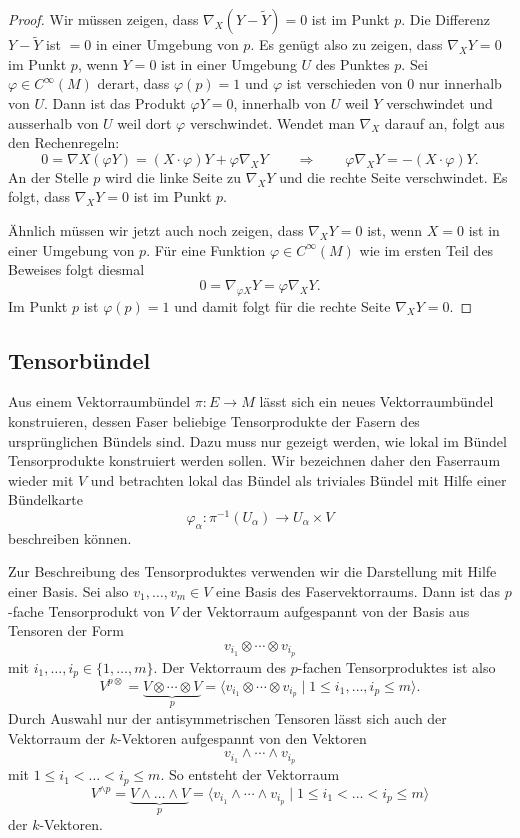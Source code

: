 \begin{proof}
Wir müssen zeigen, dass $\nabla_X(Y-\tilde{Y})=0$ ist im Punkt $p$.
Die Differenz $Y-\tilde{Y}$ ist $=0$ in einer Umgebung von $p$.
Es genügt also zu zeigen, dass $\nabla_XY=0$ im Punkt $p$, wenn $Y=0$
ist in einer Umgebung $U$ des Punktes $p$.
Sei $\varphi\in C^\infty(M)$ derart, dass $\varphi(p)=1$ und 
$\varphi$ ist verschieden von $0$ nur innerhalb von $U$.
Dann ist das Produkt $\varphi Y=0$, innerhalb von $U$ weil $Y$ verschwindet
und ausserhalb von $U$ weil dort $\varphi$ verschwindet.
Wendet man $\nabla_X$ darauf an, folgt aus den Rechenregeln:
\[
0
=
\nabla X(\varphi Y)
=
(X\cdot \varphi)Y
+
\varphi\nabla_X Y
\qquad\Rightarrow\qquad
\varphi\nabla_X Y
=
-(X\cdot\varphi)Y.
\]
An der Stelle $p$ wird die linke Seite zu $\nabla_XY$ und die rechte
Seite verschwindet.
Es folgt, dass $\nabla_XY=0$ ist im Punkt $p$.

Ähnlich müssen wir jetzt auch noch zeigen, dass $\nabla_XY=0$ ist,
wenn $X=0$ ist in einer Umgebung von $p$.
Für eine Funktion $\varphi\in C^\infty(M)$ wie im ersten Teil des Beweises
folgt diesmal
\[
0
=
\nabla_{\varphi X}Y
=
\varphi\nabla_XY.
\]
Im Punkt $p$ ist $\varphi(p)=1$ und damit folgt für die rechte Seite
$\nabla_XY=0$.
\end{proof}

%
%
\subsection{Tensorbündel}
Aus einem Vektorraumbündel $\pi\colon E\to M$ lässt sich ein neues
Vektorraumbündel konstruieren, dessen Faser beliebige Tensorprodukte
der Fasern des ursprünglichen Bündels sind.
Dazu muss nur gezeigt werden, wie lokal im Bündel Tensorprodukte
konstruiert werden sollen.
Wir bezeichnen daher den Faserraum wieder mit $V$ und betrachten
lokal das Bündel als triviales Bündel mit Hilfe einer Bündelkarte
\[
\varphi_\alpha
\colon
\pi^{-1}(U_\alpha)
\to
U_\alpha\times V 
\]
beschreiben können.

Zur Beschreibung des Tensorproduktes verwenden wir die Darstellung
mit Hilfe einer Basis.
Sei also $v_1,\dots,v_m\in V$ eine Basis des Faservektorraums.
Dann ist das $p$-fache Tensorprodukt von $V$ der Vektorraum aufgespannt
von der Basis aus Tensoren der Form
\[
v_{i_1}\otimes \cdots\otimes v_{i_p}
\]
mit $i_1,\dots,i_p\in \{1,\dots,m\}$.
Der Vektorraum des $p$-fachen Tensorproduktes ist also
\[
V^{p\otimes}
=
\underbrace{ V\otimes\cdots\otimes V }_{\displaystyle p}
=
\langle
v_{i_1}\otimes\cdots\otimes v_{i_p}
\mid
1\le
i_1,\dots,i_p 
\le m
\rangle.
\]
Durch Auswahl nur der antisymmetrischen Tensoren lässt sich auch
der Vektorraum der $k$-Vektoren aufgespannt von den Vektoren
\[
v_{i_1}\wedge\cdots\wedge v_{i_p}
\]
mit $1\le i_1 < \dots < i_p\le m$.
So entsteht der Vektorraum 
\[
V^{\wedge p}
=
\underbrace{V\wedge\dots\wedge V}_{\displaystyle p}
=
\langle
v_{i_1}\wedge\cdots\wedge v_{i_p}
\mid
1\le i_1 < \dots < i_p\le m
\rangle
\]
der $k$-Vektoren.

